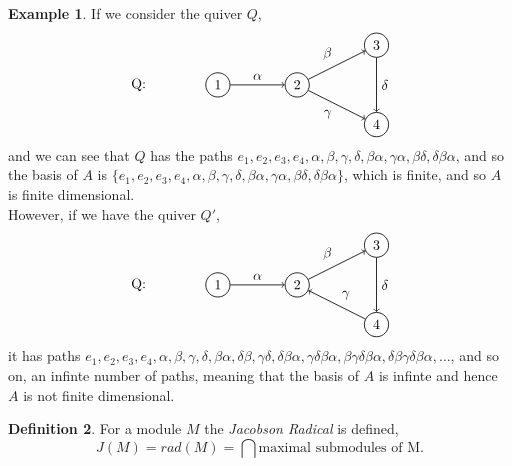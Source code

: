 \documentclass[11.5pt, twoside, a4paper, titlepage]{report}
\theoremstyle{definition}
\newtheorem{mydef}{Definition}[section]
\newtheorem{eg}[mydef]{Example}
\theoremstyle{plain}
\begin{document}
\begin{eg}
If we consider the quiver $Q$, 
\begin{equation*}
\begin{tikzpicture}[->,-latex, auto, every path/.style={->, semithick}, main node/.style={draw, circle}]
\node []			(0) at (-2,0)		{Q:};
\node	[main node]		(1) at (0,0)		{1};
\node [main node]		(2) at (2,0)		{2};
\node [main node]		(3) at (4,1)		{3};
\node [main node]		(4) at (4,-1)		{4};

\draw (1) edge node [auto] {$\alpha$} (2);
\draw (2) edge node [auto] {$\beta$} (3);
\draw (2) edge node [auto, swap] {$\gamma$} (4);
\draw (3) edge node [auto] {$\delta$} (4);
\end{tikzpicture}
\end{equation*}
and we can see that $Q$ has the paths $e_1, e_2, e_3, e_4, \alpha, \beta, \gamma, \delta, \beta\alpha, \gamma\alpha, \beta\delta, \delta\beta\alpha$, and so the basis of $A$ is $\{e_1, e_2, e_3, e_4, \alpha, \beta, \gamma, \delta, \beta\alpha, \gamma\alpha, \beta\delta, \delta\beta\alpha\}$, which is finite, and so $A$ is finite dimensional. \\
However, if we have the quiver $Q'$, 
\begin{equation*}
\begin{tikzpicture}[->,-latex, auto, every path/.style={->, semithick}, main node/.style={draw, circle}]
\node []			(0) at (-2,0)		{Q:};
\node	[main node]		(1) at (0,0)		{1};
\node [main node]		(2) at (2,0)		{2};
\node [main node]		(3) at (4,1)		{3};
\node [main node]		(4) at (4,-1)		{4};

\draw (1) edge node [auto] {$\alpha$} (2);
\draw (2) edge node [auto] {$\beta$} (3);
\draw (4) edge node [auto, swap] {$\gamma$} (2);
\draw (3) edge node [auto] {$\delta$} (4);
\end{tikzpicture}
\end{equation*}
it has paths $e_1, e_2, e_3, e_4, \alpha, \beta, \gamma, \delta, \beta\alpha,\delta\beta, \gamma\delta, \delta\beta\alpha, \gamma\delta\beta\alpha, \beta\gamma\delta\beta\alpha, \delta\beta\gamma\delta\beta\alpha, \dots$, and so on, an infinte number of paths, meaning that the basis of $A$ is infinte and hence $A$ is not finite dimensional.
\end{eg}

\begin{mydef}
For a module $M$  the \emph{Jacobson Radical} is defined, 
\begin{equation*}
J(M)=rad(M)=\bigcap \text{maximal submodules of M}.
\end{equation*}
\end{mydef}
\end{document}
